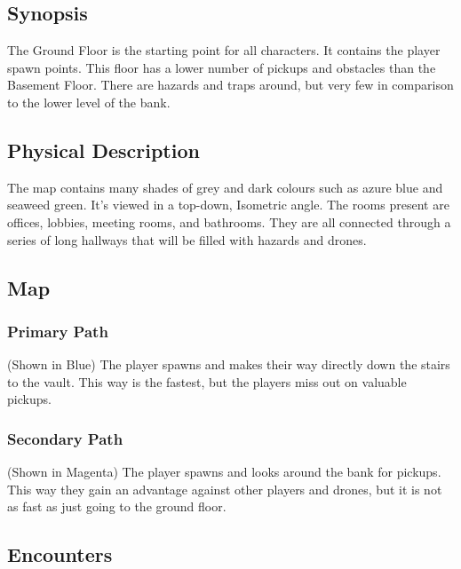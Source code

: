 \documentclass[14pt]{report}
\begin{document}
\subsection{Synopsis}

The Ground Floor is the starting point for all characters. It contains the player spawn points. This floor has a lower number of pickups and obstacles than the Basement Floor. There are hazards and traps around, but very few in comparison to the lower level of the bank.

\subsection{Physical Description}

The map contains many shades of grey and dark colours such as azure blue and seaweed green. It’s viewed in a top-down, Isometric angle. The rooms present are offices, lobbies, meeting rooms, and bathrooms. They are all connected through a series of long hallways that will be filled with hazards and drones.

\subsection{Map}



\subsubsection{Primary Path}

(Shown in Blue) The player spawns and makes their way directly down the stairs to the vault. This way is the fastest, but the players miss out on valuable pickups.

\subsubsection{Secondary Path}

(Shown in Magenta) The player spawns and looks around the bank for pickups. This way they gain an advantage against other players and drones, but it is not as fast as just going to the ground floor.


\subsection{Encounters}
\end{document}

